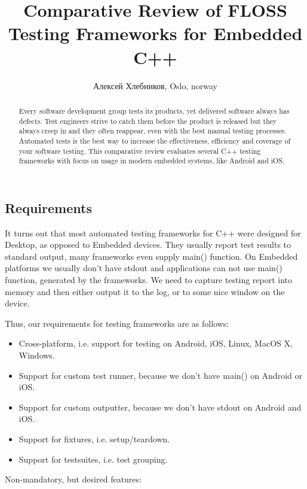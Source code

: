 \documentclass[10pt, a5paper]{article}
\begin{document}
\title{Comparative Review of FLOSS Testing Frameworks for Embedded C++}
\author{Алексей Хлебников, Oslo, norway}
\maketitle
\begin{abstract}
Every software development group tests its products, yet delivered software always has defects. Test engineers strive to catch them before the product is released but they always creep in and they often reappear, even with the best manual testing processes. Automated tests is the best way to increase \linebreak the effectiveness, efficiency and coverage of your software testing. This comparative review evaluates several C++ testing \linebreak frameworks with focus on usage in modern embedded systems, like Android and iOS.
\end{abstract}
\subsection*{Requirements}

It turns out that most automated testing frameworks for C++ were designed for Desktop, as opposed to Embedded devices. They usually report test results to standard output, many frameworks even supply main() function. On Embedded platforms we usually don't have stdout and applications can not use main() function, generated by the frameworks. We need to capture testing report into memory and then either output it to the log, or to some nice window on the device.

Thus, our requirements for testing frameworks are as follows:

\begin{itemize}
  \item Cross-platform, i.e. support for testing on Android, iOS, Linux, MacOS X, Windows.
  \item Support for custom test runner, because we don't have main() on Android or iOS.
  \item Support for custom outputter, because we don't have stdout on Android and iOS.
  \item Support for fixtures, i.e. setup/teardown.
  \item Support for testsuites, i.e. test grouping.
\end{itemize}

Non-mandatory, but desired features:
\end{document}
